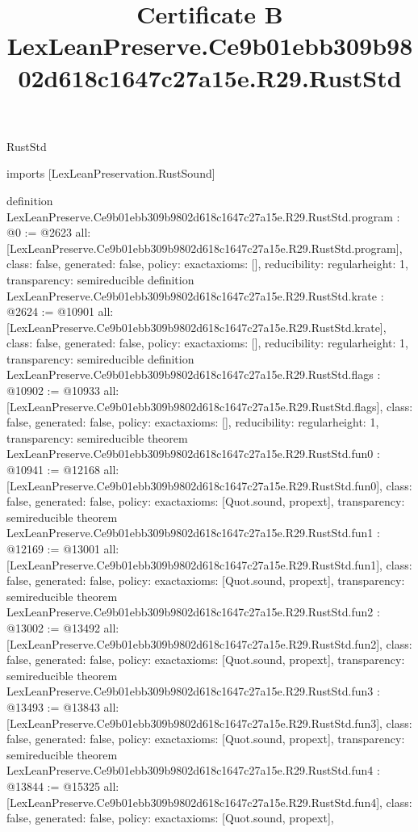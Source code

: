 \begin{lexlean}{RustStd}
\title{Certificate B LexLeanPreserve.Ce9b01ebb309b9802d618c1647c27a15e.R29.RustStd}
\begin{coremodule}
imports [LexLeanPreservation.RustSound]

definition LexLeanPreserve.Ce9b01ebb309b9802d618c1647c27a15e.R29.RustStd.program : @0 := @2623 {
  all: [LexLeanPreserve.Ce9b01ebb309b9802d618c1647c27a15e.R29.RustStd.program],
  class: false,
  generated: false,
  policy: exact{axioms: []},
  reducibility: regular{height: 1},
  transparency: semireducible
}
definition LexLeanPreserve.Ce9b01ebb309b9802d618c1647c27a15e.R29.RustStd.krate : @2624 := @10901 {
  all: [LexLeanPreserve.Ce9b01ebb309b9802d618c1647c27a15e.R29.RustStd.krate],
  class: false,
  generated: false,
  policy: exact{axioms: []},
  reducibility: regular{height: 1},
  transparency: semireducible
}
definition LexLeanPreserve.Ce9b01ebb309b9802d618c1647c27a15e.R29.RustStd.flags : @10902 := @10933 {
  all: [LexLeanPreserve.Ce9b01ebb309b9802d618c1647c27a15e.R29.RustStd.flags],
  class: false,
  generated: false,
  policy: exact{axioms: []},
  reducibility: regular{height: 1},
  transparency: semireducible
}
theorem LexLeanPreserve.Ce9b01ebb309b9802d618c1647c27a15e.R29.RustStd.fun0 : @10941 := @12168 {
  all: [LexLeanPreserve.Ce9b01ebb309b9802d618c1647c27a15e.R29.RustStd.fun0],
  class: false,
  generated: false,
  policy: exact{axioms: [Quot.sound, propext]},
  transparency: semireducible
}
theorem LexLeanPreserve.Ce9b01ebb309b9802d618c1647c27a15e.R29.RustStd.fun1 : @12169 := @13001 {
  all: [LexLeanPreserve.Ce9b01ebb309b9802d618c1647c27a15e.R29.RustStd.fun1],
  class: false,
  generated: false,
  policy: exact{axioms: [Quot.sound, propext]},
  transparency: semireducible
}
theorem LexLeanPreserve.Ce9b01ebb309b9802d618c1647c27a15e.R29.RustStd.fun2 : @13002 := @13492 {
  all: [LexLeanPreserve.Ce9b01ebb309b9802d618c1647c27a15e.R29.RustStd.fun2],
  class: false,
  generated: false,
  policy: exact{axioms: [Quot.sound, propext]},
  transparency: semireducible
}
theorem LexLeanPreserve.Ce9b01ebb309b9802d618c1647c27a15e.R29.RustStd.fun3 : @13493 := @13843 {
  all: [LexLeanPreserve.Ce9b01ebb309b9802d618c1647c27a15e.R29.RustStd.fun3],
  class: false,
  generated: false,
  policy: exact{axioms: [Quot.sound, propext]},
  transparency: semireducible
}
theorem LexLeanPreserve.Ce9b01ebb309b9802d618c1647c27a15e.R29.RustStd.fun4 : @13844 := @15325 {
  all: [LexLeanPreserve.Ce9b01ebb309b9802d618c1647c27a15e.R29.RustStd.fun4],
  class: false,
  generated: false,
  policy: exact{axioms: [Quot.sound, propext]},
}
\end{coremodule}
\end{lexlean}
